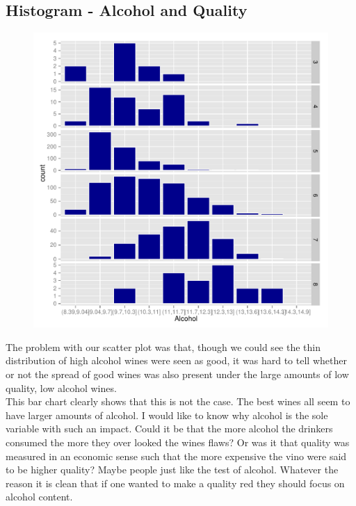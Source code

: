 \documentclass[12pt,a4paper]{article}
\begin{document}
\begin{singlespace}
\newpage
\section{Histogram - Alcohol and Quality}

\begin{figure}[h!]
	\hspace{-1cm}
    \centering
    \includegraphics[width=\textwidth,trim= 0 0 0 20]{alcoholVSqual(blue).pdf}
\end{figure}
\FloatBarrier
The problem with our scatter plot was that, though we could see the thin distribution of high alcohol wines were seen as good, it was hard to tell whether or not the spread of good wines was also present under the large amounts of low quality, low alcohol wines. \\

This bar chart clearly shows that this is not the case. The best wines all seem to have larger amounts of alcohol. I would like to know why alcohol is the sole variable with such an impact. Could it be that the more alcohol the drinkers consumed the more they over looked the wines flaws? Or was it that quality was measured in an economic sense such that the more expensive the vino were said to be higher quality? Maybe people just like the test of alcohol. Whatever the reason it is clean that if one wanted to make a quality red they should focus on alcohol content.

\end{singlespace}
\end{document}
